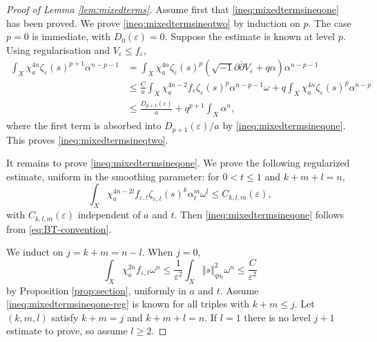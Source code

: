 \documentclass[10pt,a4paper]{amsart}
\renewcommand{\d}{\partial}
\newcommand{\ddbar}{\sqrt{-1}\d\overline{\d}}
\newcommand{\vep}{\varepsilon}
\begin{document}
\begin{proof}[Proof of Lemma \ref{lem:mixedterms}]
Assume first that \eqref{ineq:mixedtermsineqone} has been proved.  We prove \eqref{ineq:mixedtermsineqtwo} by induction on $p$.  The case $p=0$ is immediate, with $D_0(\vep)=0$.  Suppose the estimate is known at level $p$.  Using regularisation and $V_\vep\leq f_\vep$,
\begin{align*}
\int_X\chi_a^{4n}\zeta_\vep(s)^{p+1}\alpha^{n-p-1}
&=\int_X\chi_a^{4n}\zeta_\vep(s)^p(\ddbar V_\vep+q\alpha)\alpha^{n-p-1}\\
&\leq \frac{C}{a}\int_X\chi_a^{4n-2}f_\vep\zeta_\vep(s)^p\alpha^{n-p-1}\omega
+q\int_X\chi_a^{4n}\zeta_\vep(s)^p\alpha^{n-p}\\
&\leq \frac{D_{p+1}(\vep)}{a}+q^{p+1}\int_X\alpha^n,
\end{align*}
where the first term is absorbed into $D_{p+1}(\vep)/a$ by \eqref{ineq:mixedtermsineqone}.  This proves \eqref{ineq:mixedtermsineqtwo}.

It remains to prove \eqref{ineq:mixedtermsineqone}.  We prove the following regularized estimate, uniform in the smoothing parameter: for $0<t\le1$ and $k+m+l=n$,
\begin{equation}\label{ineq:mixedtermsineqone-reg}
\int_X\chi_a^{4n-2l}f_{\vep,t}\zeta_{\vep,t}(s)^k\alpha_t^m\omega^l
\leq C_{k,l,m}(\vep),
\end{equation}
with $C_{k,l,m}(\vep)$ independent of $a$ and $t$.  Then \eqref{ineq:mixedtermsineqone} follows from \eqref{eq:BT-convention}.

We induct on $j=k+m=n-l$.  When $j=0$,
\[
\int_X\chi_a^{2n}f_{\vep,t}\omega^n
\leq \frac1{\vep^2}\int_X\Vert s\Vert_{q u_t}^2\omega^n
\leq \frac{C}{\vep^2}
\]
by Proposition \ref{prop:section}, uniformly in $a$ and $t$.
Assume \eqref{ineq:mixedtermsineqone-reg} is known for all triples with $k+m\leq j$.  Let $(k,m,l)$ satisfy $k+m=j$ and $k+m+l=n$.  If $l=1$ there is no level $j+1$ estimate to prove, so assume $l\ge2$.


\end{proof}
\end{document}
